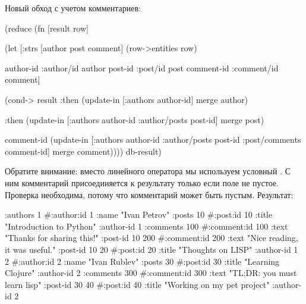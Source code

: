 Новый обход с учетом комментариев:

\begin{english}
  \begin{clojure}
(reduce
 (fn [result row]

   (let [{:strs [author post comment]}
         (row->entities row)

         {author-id :author/id}   author
         {post-id :post/id}       post
         {comment-id :comment/id} comment]

     (cond-> result
       :then
       (update-in [:authors
                   author-id] merge author)

       :then
       (update-in [:authors
                   author-id
                   :author/posts
                   post-id] merge post)

       comment-id
       (update-in [:authors
                   author-id
                   :author/posts
                   post-id
                   :post/comments
                   comment-id] merge comment))))
 {}
 db-result)
  \end{clojure}
\end{english}

Обратите внимание: вместо линейного оператора \code{->} мы используем условный . С ним комментарий присоединяется к результату только если поле  не пустое. Проверка необходима, потому что комментарий может быть пустым. Результат:

\begin{english}
  \begin{clojure}
{:authors
 {1 #:author{:id 1
             :name "Ivan Petrov"
             :posts {10 #:post{:id 10
                               :title "Introduction to Python"
                               :author-id 1
                               :comments {100 #:comment{:id 100
                                                        :text "Thanks for sharing this!"
                                                        :post-id 10}
                                          200 #:comment{:id 200
                                                        :text "Nice reading, it was useful."
                                                        :post-id 10}}}
                     20 #:post{:id 20 :title "Thoughts on LISP" :author-id 1}}}
  2 #:author{:id 2
             :name "Ivan Rublev"
             :posts {30 #:post{:id 30
                               :title "Learning Clojure"
                               :author-id 2
                               :comments {300 #:comment{:id 300
                                                        :text "TL;DR: you must learn lisp"
                                                        :post-id 30}}}
                     40 #:post{:id 40 :title "Working on my pet project" :author-id 2}}}}}
  \end{clojure}
\end{english}

